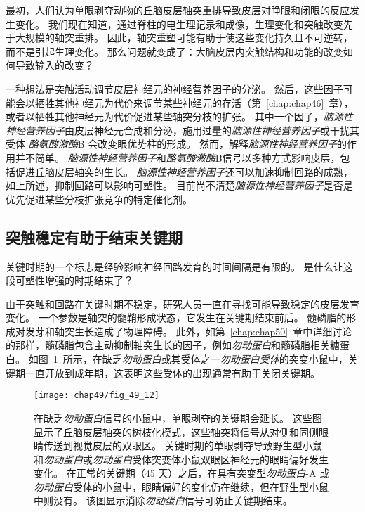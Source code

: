 最初，人们认为单眼剥夺动物的丘脑皮层轴突重排导致皮层对睁眼和闭眼的反应发生变化。
我们现在知道，通过脊柱的电生理记录和成像，生理变化和突触改变先于大规模的轴突重排。
因此，轴突重塑可能有助于使这些变化持久且不可逆转，而不是引起生理变化。
那么问题就变成了：大脑皮层内突触结构和功能的改变如何导致输入的改变？


一种想法是突触活动调节皮层神经元的神经营养因子的分泌。
然后，这些因子可能会以牺牲其他神经元为代价来调节某些神经元的存活（第~\ref{chap:chap46}~章），或者以牺牲其他神经元为代价促进某些轴突分枝的扩张。
其中一个因子，\textit{脑源性神经营养因子}由皮层神经元合成和分泌，施用过量的\textit{脑源性神经营养因子}或干扰其受体 \textit{酪氨酸激酶}B 会改变眼优势柱的形成。
然而，解释\textit{脑源性神经营养因子}的作用并不简单。
\textit{脑源性神经营养因子}和\textit{酪氨酸激酶}B信号以多种方式影响皮层，包括促进丘脑皮层轴突的生长。
\textit{脑源性神经营养因子}还可以加速抑制回路的成熟，如上所述，抑制回路可以影响可塑性。
目前尚不清楚\textit{脑源性神经营养因子}是否是优先促进某些分枝扩张竞争的特定催化剂。



\subsection{突触稳定有助于结束关键期}

关键时期的一个标志是经验影响神经回路发育的时间间隔是有限的。
是什么让这段可塑性增强的时期结束了？


由于突触和回路在关键时期不稳定，研究人员一直在寻找可能导致稳定的皮层发育变化。
一个参数是轴突的髓鞘形成状态，它发生在关键期结束前后。
髓磷脂的形成对发芽和轴突生长造成了物理障碍。
此外，如第~\ref{chap:chap50}~章中详细讨论的那样，髓磷脂包含主动抑制轴突生长的因子，例如\textit{勿动蛋白}和髓磷脂相关糖蛋白。 
如图~\ref{fig:49_12}~所示，在缺乏\textit{勿动蛋白}或其受体之一\textit{勿动蛋白受体}的突变小鼠中，关键期一直开放到成年期，这表明这些受体的出现通常有助于关闭关键期。


\begin{figure}[htbp]
	\centering
	\texttt{[image: chap49/fig\_49\_12]}
	\caption{在缺乏\textit{勿动蛋白}信号的小鼠中，单眼剥夺的关键期会延长。
		这些图显示了丘脑皮层轴突的树枝化模式，这些轴突将信号从对侧和同侧眼睛传送到视觉皮层的双眼区。
		关键时期的单眼剥夺导致野生型小鼠和\textit{勿动蛋白}或\textit{勿动蛋白}受体突变体小鼠双眼区神经元的眼睛偏好发生变化。
		在正常的关键期（45 天）之后，在具有突变型\textit{勿动蛋白}-A 或\textit{勿动蛋白}受体的小鼠中，眼睛偏好的变化仍在继续，但在野生型小鼠中则没有。
		该图显示消除\textit{勿动蛋白}信号可防止关键期结束\cite{mcgee2005experience}。}
	\label{fig:49_12}
\end{figure}


